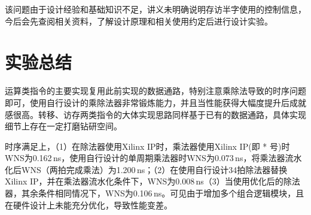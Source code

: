 \documentclass[UTF-8,twoside,c5size]{ctexart}
\begin{document}
	该问题由于设计经验和基础知识不足，讲义未明确说明存访半字使用的控制信息，今后会先查阅相关资料，了解设计原理和相关使用约定后进行设计实验。
	
	\section{实验总结}
	
	运算类指令的主要实现复用此前实现的数据通路，特别注意乘除法导致的时序问题即可，使用自行设计的乘除法器非常锻炼能力，并且当性能获得大幅度提升后成就感很高。转移、访存两类指令的大体实现思路同样基于已有的数据通路，具体实现细节上存在一定打磨钻研空间。
	
	时序满足上，（1）在除法器使用Xilinx IP时，乘法器使用Xilinx IP(即 * 号)时WNS为0.162\,ns，使用自行设计的单周期乘法器时WNS为0.073\,ns，将乘法器流水化后WNS（两拍完成乘法）为1.200\,ns；（2）在使用自行设计34拍除法器替换Xilinx IP，并在乘法器流水化条件下，WNS为0.008\,ns（3）当使用优化后的除法器，其余条件相同情况下，WNS为0.106\,ns。可见由于增加多个组合逻辑模块，且在硬件设计上未能充分优化，导致性能变差。
	
\end{document}
